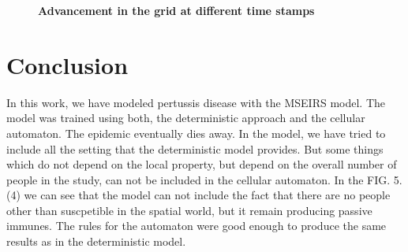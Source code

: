\documentclass[prl,12pt,citeautoscript,reprint]{revtex4-1}
\begin{document}
\begin{figure}[H]
\begin{center}
\begin{minipage}{0.45\textwidth}
{ \par}
\end{minipage}
 \caption{\textbf{Advancement in the grid at different time stamps}}
  \label{fig:bn}
\end{center}
\end{figure}



\section{Conclusion}
In this work, we have modeled pertussis disease with the MSEIRS model. The model was trained using both, the deterministic approach and the cellular automaton. The epidemic eventually dies away. 
In the model, we have tried to include all the setting that the deterministic model provides. But some things which do not depend on the local property, but depend on the overall number of people in the study, can not be included in the cellular automaton. In the FIG. 5.(4) we can see that the model can not include the fact that there are no people other than suscpetible in the spatial world, but it remain producing passive immunes. The rules for the automaton were good enough to produce the same results as in the deterministic model.

\nocite{*}
  

\end{document}
